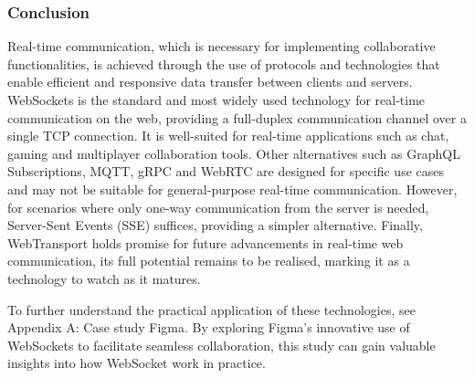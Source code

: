 \subsubsection{Conclusion}

Real-time communication, which is necessary for implementing collaborative functionalities, is achieved through the use of protocols and technologies that enable efficient and responsive data transfer between clients and servers. WebSockets is the standard and most widely used technology for real-time communication on the web, providing a full-duplex communication channel over a single TCP connection. It is well-suited for real-time applications such as chat, gaming and multiplayer collaboration tools. Other alternatives such as GraphQL Subscriptions, MQTT, gRPC and WebRTC are designed for specific use cases and may not be suitable for general-purpose real-time communication. However, for scenarios where only one-way communication from the server is needed, Server-Sent Events (SSE) suffices, providing a simpler alternative. Finally, WebTransport holds promise for future advancements in real-time web communication, its full potential remains to be realised, marking it as a technology to watch as it matures.

To further understand the practical application of these technologies, see Appendix A: Case study Figma. By exploring Figma's innovative use of WebSockets to facilitate seamless collaboration, this study can gain valuable insights into how WebSocket work in practice.
